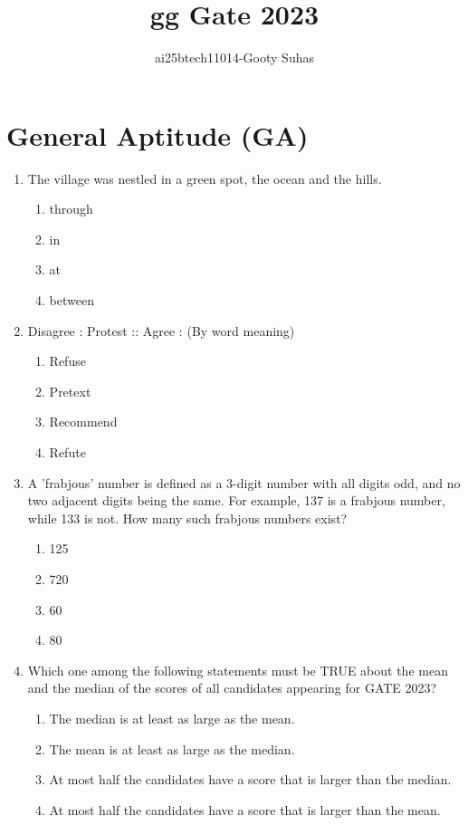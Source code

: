 \documentclass[journal,12pt,onecolumn]{IEEEtran}
\theoremstyle{remark}
\begin{document}
\title{gg Gate 2023}
\author{ai25btech11014-Gooty Suhas}
\maketitle

\section*{General Aptitude (GA)}
\vspace{0.5cm}
\begin{enumerate}

\item The village was nestled in a green spot,\underline{\hspace{10mm}} the ocean and the hills.
\begin{enumerate}
\item through
\item in
\item at
\item between
\end{enumerate}
\vspace{0.5cm}

\item Disagree : Protest :: Agree : \underline{\hspace{10mm}}(By word meaning)
\begin{enumerate}
\item Refuse
\item Pretext
\item Recommend
\item Refute
\end{enumerate}
\vspace{0.5cm}

\item A 'frabjous' number is defined as a 3-digit number with all digits odd, and no two adjacent digits being the same. For example, 137 is a frabjous number, while 133 is not. How many such frabjous numbers exist?
\begin{enumerate}
\item 125
\item 720
\item 60
\item 80
\end{enumerate}
\vspace{0.5cm}

\item Which one among the following statements must be TRUE about the mean and the median of the scores of all candidates appearing for GATE 2023?
\begin{enumerate}
\item The median is at least as large as the mean.
\item The mean is at least as large as the median.
\item At most half the candidates have a score that is larger than the median.
\item At most half the candidates have a score that is larger than the mean.
\end{enumerate}
\vspace{0.5cm}


\end{enumerate}
\end{document}
